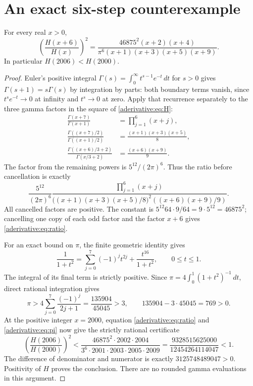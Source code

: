 \section{An exact six-step counterexample}\label{aderivative:sec:counterexample}
\begin{aderivativetheorem}\label{aderivative:thm:ratio}
For every real $x>0$,
\begin{equation}\label{aderivative:eq:ratio}
\left(\frac{H(x+6)}{H(x)}\right)^2
=\frac{46875^2(x+2)(x+4)}
{\pi^6(x+1)(x+3)(x+5)(x+9)}.
\end{equation}
In particular $H(2006)<H(2000)$.
\end{aderivativetheorem}
\begin{proof}
Euler's positive integral
$\Gamma(s)=\int_0^\infty t^{s-1}e^{-t}\,dt$ for $s>0$
gives $\Gamma(s+1)=s\Gamma(s)$ by integration by parts: both
boundary terms vanish, since $t^se^{-t}\to0$ at infinity and
$t^s\to0$ at zero. Apply that recurrence separately to the
three gamma factors in the square of \eqref{aderivative:eq:H}:
\begin{align}
\frac{\Gamma(x+7)}{\Gamma(x+1)}
&=\prod_{j=1}^6(x+j),\label{aderivative:eq:factorialratio}\\
\frac{\Gamma((x+7)/2)}{\Gamma((x+1)/2)}
&=\frac{(x+1)(x+3)(x+5)}8,\label{aderivative:eq:halfratio}\\
\frac{\Gamma((x+6)/3+2)}{\Gamma(x/3+2)}
&=\frac{(x+6)(x+9)}9.\label{aderivative:eq:thirdratio}
\end{align}
The factor from the remaining powers is $5^{12}/(2\pi)^6$.
Thus the ratio before cancellation is exactly
\[
\frac{5^{12}}{(2\pi)^6}
\frac{\prod_{j=1}^6(x+j)}
{\bigl((x+1)(x+3)(x+5)/8\bigr)^2
 ((x+6)(x+9)/9)}.
\]
All cancelled factors are positive. The constant is
$5^{12}64\cdot9/64=9\cdot5^{12}=46875^2$;
cancelling one copy of each odd factor and the factor $x+6$
gives \eqref{aderivative:eq:ratio}.

For an exact bound on $\pi$, the finite geometric identity gives
\[
\frac1{1+t^2}=\sum_{j=0}^7(-1)^jt^{2j}
+\frac{t^{16}}{1+t^2},\qquad 0\le t\le1.
\]
The integral of its final term is strictly positive. Since
$\pi=4\int_0^1(1+t^2)^{-1}\,dt$, direct rational integration gives
\begin{equation}\label{aderivative:eq:pi}
\pi>4\sum_{j=0}^7\frac{(-1)^j}{2j+1}
=\frac{135904}{45045}>3,
\qquad 135904-3\cdot45045=769>0.
\end{equation}
At the positive integer $x=2000$, equation \eqref{aderivative:eq:ratio} and
\eqref{aderivative:eq:pi} now give the strictly rational certificate
\begin{equation}\label{aderivative:eq:certificate}
\left(\frac{H(2006)}{H(2000)}\right)^2
<\frac{46875^2\cdot2002\cdot2004}
{3^6\cdot2001\cdot2003\cdot2005\cdot2009}
=\frac{9328515625000}{12454264114047}<1.
\end{equation}
The difference of denominator and numerator is exactly
$3125748489047>0$. Positivity of $H$ proves the conclusion.
There are no rounded gamma evaluations in this argument.
\end{proof}

